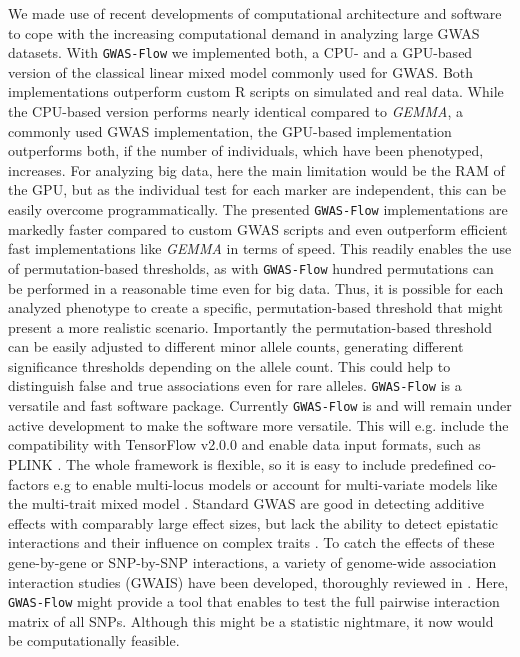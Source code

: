 We made use of recent developments of computational architecture and software to cope with the increasing
computational demand in analyzing large GWAS datasets. With \texttt{GWAS-Flow} we implemented both, a CPU- and
a GPU-based version of the classical linear mixed model commonly used for GWAS. Both implementations
outperform custom R scripts on simulated and real data. While the CPU-based version performs nearly identical
compared to \textit{GEMMA}, a commonly used GWAS implementation, the GPU-based implementation outperforms
both, if the number of individuals, which have been phenotyped, increases. For analyzing big data, here the
main limitation would be the RAM of the GPU, but as the individual test for each marker are independent, this
can be easily overcome programmatically. The presented \texttt{GWAS-Flow} implementations are markedly faster
compared to custom GWAS scripts and even outperform efficient fast implementations like \textit{GEMMA} in
terms of speed. This readily enables the use of permutation-based thresholds, as with \texttt{GWAS-Flow}
hundred permutations can be performed in a reasonable time even for big data. Thus, it is possible for each
analyzed phenotype to create a specific, permutation-based threshold that might present a more realistic
scenario. Importantly the permutation-based threshold can be easily adjusted to different minor allele counts,
generating different significance thresholds depending on the allele count. This could help to distinguish
false and true associations even for rare alleles. \texttt{GWAS-Flow} is a versatile and fast software
package. Currently \texttt{GWAS-Flow} is and will remain under active development to make the software more
versatile. This will e.g. include the compatibility with TensorFlow v2.0.0 and enable data input formats, such
as PLINK \cite{purcell2007plink}. The whole framework is flexible, so it is easy to include predefined
co-factors e.g to enable multi-locus models \cite{segura2012efficient} or account for multi-variate models
like the multi-trait mixed model \cite{korte2012mixed}. Standard GWAS are good in detecting additive effects
with comparably large effect sizes, but lack the ability to detect epistatic interactions and their influence
on complex traits \cite{mckinney2012six,korte2013advantages}. To catch the effects of these gene-by-gene or
SNP-by-SNP interactions, a variety of genome-wide association interaction studies (GWAIS) have been developed,
thoroughly reviewed in \cite{ritchie2018GWAIS}. Here, \texttt{GWAS-Flow} might provide a tool that enables to
test the full pairwise interaction matrix of all SNPs. Although this might be a statistic nightmare, it now
would be computationally feasible.


